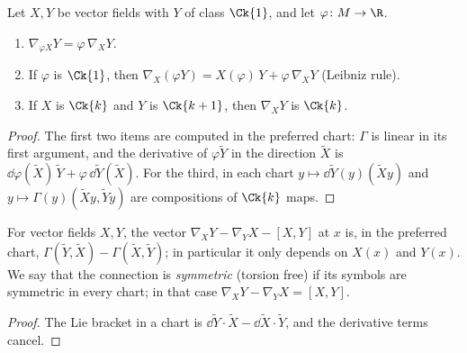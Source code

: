 \begin{proposition}
  \label{prop:conn-rules}
  \leanok
  Let $X, Y$ be vector fields with $Y$ of class $\Ck{1}$, and let $\varphi \colon M \to \R$.
  \begin{enumerate}
    \item $\nabla_{\varphi X} Y = \varphi\, \nabla_X Y$.
    \item If $\varphi$ is $\Ck{1}$, then $\nabla_X(\varphi Y) = X(\varphi)\, Y + \varphi\,\nabla_X Y$
    (Leibniz rule).
    \item If $X$ is $\Ck{k}$ and $Y$ is $\Ck{k+1}$, then $\nabla_X Y$ is $\Ck{k}$.
  \end{enumerate}
\end{proposition}

\begin{proof}
  \leanok
  The first two items are computed in the preferred chart: $\Gamma$ is linear in its first
  argument, and the derivative of $\varphi \tilde Y$ in the direction $\tilde X$ is
  $\dd\varphi(\tilde X)\,\tilde Y + \varphi\,\dd\tilde Y(\tilde X)$. For the third, in each chart
  $y \mapsto \dd\tilde Y(y)(\tilde X y)$ and $y \mapsto \Gamma(y)(\tilde X y, \tilde Y y)$ are
  compositions of $\Ck{k}$ maps.
\end{proof}

\begin{proposition}[Torsion]
  \label{prop:conn-torsion}
  \leanok
  For vector fields $X, Y$, the vector $\nabla_X Y - \nabla_Y X - [X, Y]$ at $x$ is, in the
  preferred chart, $\Gamma(\tilde Y, \tilde X) - \Gamma(\tilde X, \tilde Y)$; in particular it only
  depends on $X(x)$ and $Y(x)$. We say that the connection is \emph{symmetric} (torsion free) if
  its symbols are symmetric in every chart; in that case $\nabla_X Y - \nabla_Y X = [X, Y]$.
\end{proposition}

\begin{proof}
  \leanok
  The Lie bracket in a chart is $\dd\tilde Y \cdot \tilde X - \dd\tilde X \cdot \tilde Y$, and
  the derivative terms cancel.
\end{proof}

